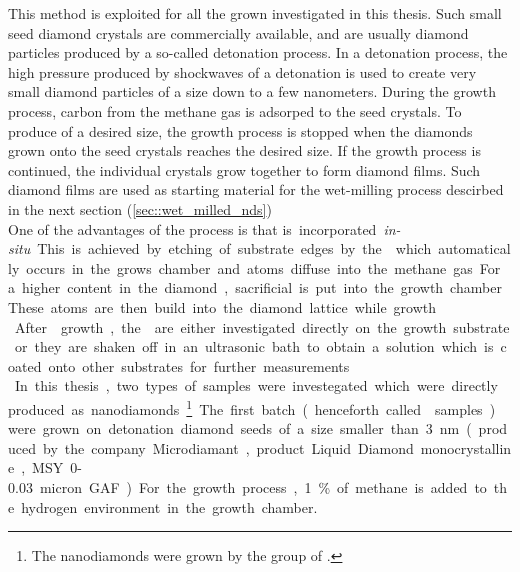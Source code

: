 	This method is exploited for all the \CVD grown \nds investigated in this thesis.
	Such small seed diamond crystals are commercially available, and are usually diamond particles produced by a so-called detonation process.
	In a detonation process, the high pressure produced by shockwaves of a detonation is used to create very small diamond particles of a size down to a few nanometers.
	During the \CVD growth process, carbon from the methane gas is adsorped  to the seed crystals.
	To produce \nds of a desired size, the growth process is stopped when the diamonds grown onto the seed crystals reaches the desired size.
	If the growth process is continued, the individual crystals grow together to form diamond films.
	Such diamond films are used as starting material for the wet-milling process descirbed in the next section (\autoref{sec::wet_milled_nds})
	\\
	One of the advantages of the \CVD process is that \si is incorporated \textit{in-situ}.
	This is achieved by etching of \si substrate edges by the which automatically occurs in the grows chamber and \si atoms diffuse into the methane gas.
	For a higher \si content in the diamond, sacrificial \si is put into the growth chamber.
	These atoms are then build into the diamond lattice while growth.
	\\
	After \nd growth, the \nds are either investigated directly on the growth substrate or they are shaken off in an ultrasonic bath to obtain a solution which is coated onto other substrates for further measurements.
	\\
	In this thesis, two types of samples were investegated which were directly produced as nanodiamonds.
	\footnote{The \CVD nanodiamonds were grown by the group of \schreck \cite{}.}
	The first batch (henceforth called \CVD samples) were grown on detonation diamond seeds of a size smaller than \SI{3}{nm}(produced by the company Microdiamant, product Liquid Diamond monocrystalline, MSY {0-0.03} micron GAF).
	For the growth process, 1\% of methane is added to the hydrogen environment in the growth chamber.
